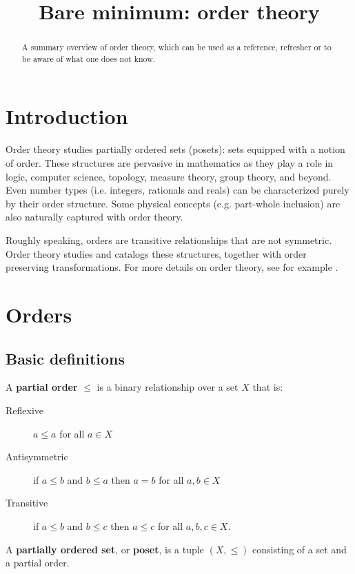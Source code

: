 \documentclass{article}
\title{Bare minimum: order theory}
\date{\vspace{-5ex}}
\newcommand{\marginleft}[1] {\reversemarginpar\marginpar{#1}}
\begin{document}
\maketitle


\begin{abstract}
A summary overview of order theory, which can be used as a reference, refresher or to be aware of what one does not know.
\end{abstract}

\section{Introduction}

Order theory studies partially ordered sets (posets): sets equipped with a notion of order. These structures are pervasive in mathematics as they play a role in logic, computer science, topology, measure theory, group theory, and beyond. Even number types (i.e. integers, rationals and reals) can be characterized purely by their order structure. Some physical concepts (e.g. part-whole inclusion) are also naturally captured with order theory.

Roughly speaking, orders are transitive relationships that are not symmetric. Order theory studies and catalogs these structures, together with order preserving transformations. For more details on order theory, see for example \cite{davey2002introduction, pinter2014book}.

\section{Orders}

\subsection{Basic definitions}

\begin{defn}
	A \textbf{partial order} \marginleft{Partial order, poset: $(X, \leq)$} $\leq$ is a binary relationship over a set $X$ that is:
	\begin{description}
		\item[Reflexive] $a \leq a$ for all $a \in X$
		\item[Antisymmetric] if $a \leq b$ and $b \leq a$ then $a = b$ for all $a, b \in X$
		\item[Transitive] if $a \leq b$ and $b \leq c$ then $a \leq c$ for all $a, b, c \in X$.
	\end{description}
	A \textbf{partially ordered set}, or \textbf{poset}, is a tuple $(X, \leq)$ consisting of a set and a partial order.
\end{defn}
\end{document}
